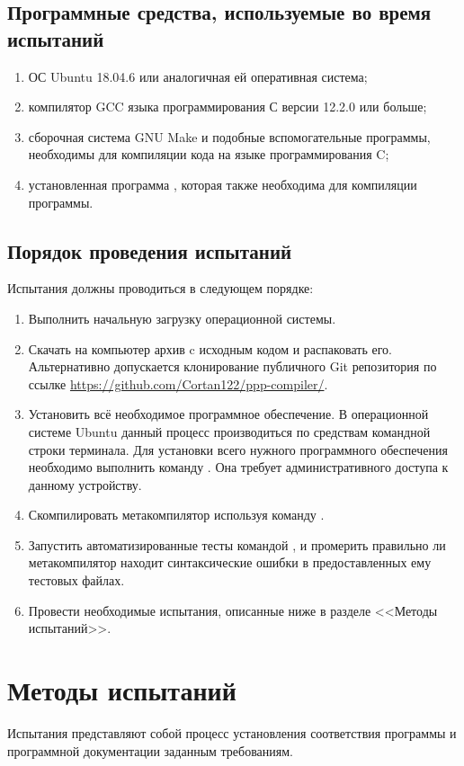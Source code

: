 \subsection{Программные средства, используемые во время испытаний}
\begin{enumerate}
  \item ОС Ubuntu 18.04.6 или аналогичная ей оперативная система;
  \item компилятор GCC языка программирования С версии 12.2.0 или больше;
  \item сборочная система GNU Make и подобные вспомогательные программы, необходимы для компиляции кода на языке программирования C;
  \item установленная программа , которая также необходима для компиляции программы.
\end{enumerate}

\subsection{Порядок проведения испытаний}
Испытания должны проводиться в следующем порядке:
\begin{enumerate}
  \item Выполнить начальную загрузку операционной системы.
  \item Скачать на компьютер архив c исходным кодом и распаковать его.
    Альтернативно допускается клонирование публичного Git репозитория по ссылке \url{https://github.com/Cortan122/ppp-compiler/}.
  \item Установить всё необходимое программное обеспечение.
    В операционной системе Ubuntu данный процесс производиться по средствам командной строки терминала.
    Для установки всего нужного программного обеспечения необходимо выполнить команду .
    Она требует административного доступа к данному устройству.
  \item Скомпилировать метакомпилятор используя команду .
  \item Запустить автоматизированные тесты командой , и промерить правильно ли метакомпилятор находит синтаксические ошибки в предоставленных ему тестовых файлах.
  \item Провести необходимые испытания, описанные ниже в разделе <<Методы испытаний>>.
\end{enumerate}

\section{Методы испытаний}
Испытания представляют собой процесс установления соответствия программы и программной документации заданным требованиям.


